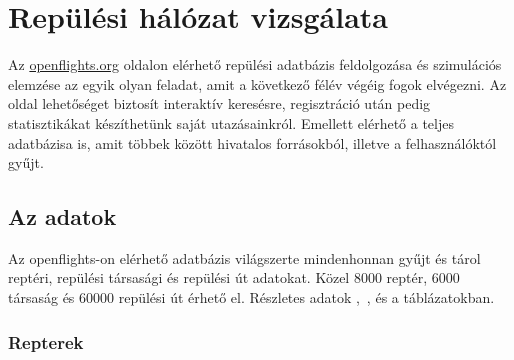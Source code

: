 \chapter{Repülési hálózat vizsgálata}\label{sect:chapter_test}

Az \href{http://openflights.org/}{openflights.org} oldalon elérhető repülési adatbázis feldolgozása és szimulációs elemzése az egyik olyan feladat, amit a következő félév végéig fogok elvégezni. Az oldal lehetőséget biztosít interaktív keresésre, regisztráció után pedig statisztikákat készíthetünk saját utazásainkról. Emellett elérhető a teljes adatbázisa is, amit többek között hivatalos forrásokból, illetve a felhasználóktól gyűjt.

  \section{Az adatok}

  Az openflights-on elérhető adatbázis világszerte mindenhonnan gyűjt és tárol reptéri, repülési társasági és repülési út adatokat. Közel 8000 reptér, 6000 társaság és 60000 repülési út érhető el. Részletes adatok ,~, és a  táblázatokban.

    \subsection{Repterek}


